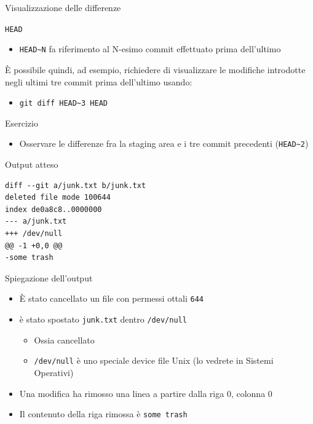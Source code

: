 \documentclass[xcolor=dvipsnames,presentation]{beamer}
\begin{document}
\begin{frame}{Visualizzazione delle differenze}
\begin{block}{\texttt{HEAD}}
\begin{itemize}
            \item \texttt{HEAD\textasciitilde{}N} fa riferimento al N-esimo commit effettuato prima dell'ultimo
        \end{itemize}
        È possibile quindi, ad esempio, richiedere di visualizzare le modifiche introdotte negli ultimi tre commit prima dell'ultimo usando:
        \begin{itemize}
            \item \texttt{git diff HEAD\textasciitilde{}3 HEAD}
        \end{itemize}
    \end{block}
    \begin{block}{Esercizio}
        \begin{itemize}
            \item Osservare le differenze fra la staging area e i tre commit precedenti (\texttt{HEAD\textasciitilde{}2})
        \end{itemize}
    \end{block}
    \begin{block}{Output atteso}
        \begin{Verbatim}[fontsize=\scriptsize]
diff --git a/junk.txt b/junk.txt
deleted file mode 100644
index de0a8c8..0000000
--- a/junk.txt
+++ /dev/null
@@ -1 +0,0 @@
-some trash
        \end{Verbatim}
    \end{block}
        \begin{block}{Spiegazione dell'output}
        \begin{itemize}
            \item È stato cancellato un file con permessi ottali \texttt{644}
            \item è stato spostato \texttt{junk.txt} dentro \texttt{/dev/null}
            \begin{itemize}
                \item Ossia cancellato
                \item \texttt{/dev/null} è uno speciale device file Unix (lo vedrete in Sistemi Operativi)
            \end{itemize}
            \item Una modifica ha rimosso una linea a partire dalla riga 0, colonna 0
            \item Il contenuto della riga rimossa è \texttt{some trash}
        \end{itemize}
    \end{block}
\end{frame}
\end{document}
